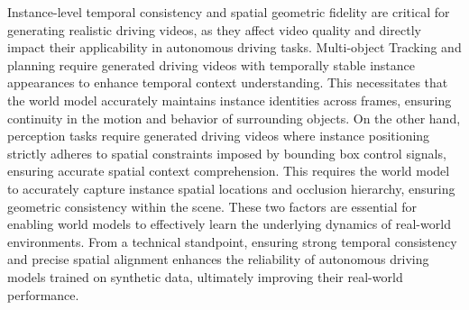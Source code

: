 Instance-level temporal consistency and spatial geometric fidelity are critical for generating realistic driving videos, as they affect video quality \cite{Thomas2018fvd} and directly impact their applicability in autonomous driving tasks. Multi-object Tracking \cite{streampetr} and planning \cite{hu2023planningorientedautonomousdriving} require generated driving videos with temporally stable instance appearances to enhance temporal context understanding. This necessitates that the world model accurately maintains instance identities across frames, ensuring continuity in the motion and behavior of surrounding objects.
On the other hand, perception tasks \cite{streampetr} require generated driving videos where instance positioning strictly adheres to spatial constraints imposed by bounding box control signals, ensuring accurate spatial context comprehension. This requires the world model to accurately capture instance spatial locations and occlusion hierarchy, ensuring geometric consistency within the scene.
These two factors are essential for enabling world models to effectively learn the underlying dynamics of real-world environments. From a technical standpoint, ensuring strong temporal consistency and precise spatial alignment enhances the reliability of autonomous driving models trained on synthetic data, ultimately improving their real-world performance.



